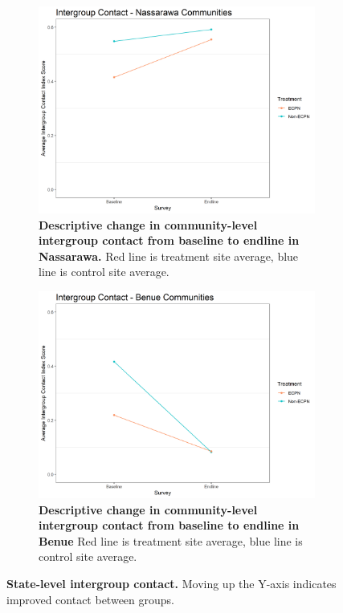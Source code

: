 \documentclass[11pt]{article}
\begin{document}
\begin{figure}[H]
    \begin{subfigure}[b]{.48\textwidth}
    \centering
        \includegraphics[width=\linewidth]{../../../figs/conComm_plot_nas.png}
        \caption{\textbf{Descriptive change in community-level intergroup contact from baseline to endline in Nassarawa.} Red line is treatment site average, blue line is control site average.}
        \label{fig:con_nas}
    \end{subfigure}
    \hfill
    \begin{subfigure}[b]{.48\textwidth}
    \centering
        \includegraphics[width=\linewidth]{../../../figs/conComm_plot_ben.png}
        \caption{\textbf{Descriptive change in community-level intergroup contact from baseline to endline in Benue} Red line is treatment site average, blue line is control site average.}
        \label{fig:con_ben}
    \end{subfigure}
    \caption{\textbf{State-level intergroup contact.} Moving up the Y-axis indicates improved contact between groups.}
\end{figure}
\end{document}
